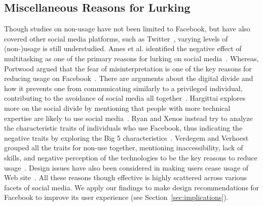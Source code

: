 \subsection{Miscellaneous Reasons for Lurking}
Though studies on non-usage have not been limited to Facebook, but have also covered other social media platforms, such as Twitter~\cite{schoenebeck2014giving}, varying levels of (non-)usage is still understudied. Ames et al. identified the negative effect of multitasking as one of the primary reasons for lurking on social media~\cite{ames2013managing}. Whereas, Portwood argued that the fear of misinterpretation is one of the key reasons for reducing usage on Facebook~\cite{portwood2013media}. There are arguments about the digital divide and how it prevents one from communicating similarly to a privileged individual, contributing to the avoidance of social media all together~\cite{van2005deepening,warschauer2004technology}. Hargittai explores more on the social divide by mentioning that people with more technical expertise are likely to use social media~\cite{hargittai2007whose}. Ryan and Xenos instead try to analyze the characteristic traits of individuals who use Facebook, thus indicating the negative traits by exploring the Big 5 characteristics~\cite{ryan2011uses}. Verdegem and Verhoest grouped all the traits for non-use together, mentioning inaccessibility, lack of skills, and negative perception of the technologies to be the key reasons to reduce usage~\cite{verdegem2009profiling}. Design issues have also been considered in making users cease usage of Web site~\cite{pierce2012undesigning,satchell2009beyond}. All these reasons though effective is highly scattered across various facets of social media. We apply our findings to make design recommendations for Facebook to improve its user experience (see Section~\ref{sec:implications}).